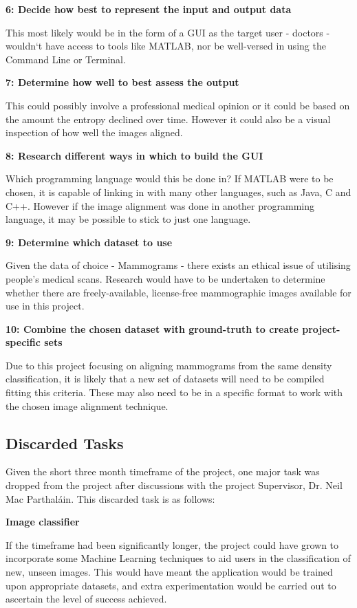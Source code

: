 \noindent \textbf{6: Decide how best to represent the input and output data}

This most likely would be in the form of a \acrshort{GUI} as the target user - doctors - wouldn`t have access to tools like MATLAB, nor be well-versed in using the Command Line or Terminal.

\noindent \textbf{7: Determine how well to best assess the output}

This could possibly involve a professional medical opinion or it could be based on the amount the entropy declined over time. However it could also be a visual inspection of how well the images aligned.

\noindent \textbf{8: Research different ways in which to build the \acrshort{GUI}}

Which programming language would this be done in? If MATLAB were to be chosen, it is capable of linking in with many other languages, such as Java, C and C++. However if the image alignment was done in another programming language, it may be possible to stick to just one language.

\noindent \textbf{9: Determine which dataset to use}

Given the data of choice - Mammograms - there exists an ethical issue of utilising people's medical scans. Research would have to be undertaken to determine whether there are freely-available, license-free mammographic images available for use in this project.

\noindent \textbf{10: Combine the chosen dataset with ground-truth to create project-specific sets}

Due to this project focusing on aligning mammograms from the same density classification, it is likely that a new set of datasets will need to be compiled fitting this criteria. These may also need to be in a specific format to work with the chosen image alignment technique.

\subsection{Discarded Tasks}

Given the short three month timeframe of the project, one major task was dropped from the project after discussions with the project Supervisor, Dr. Neil Mac Parthal\'ain. This discarded task is as follows:

\noindent \textbf{Image classifier}

If the timeframe had been significantly longer, the project could have grown to incorporate some Machine Learning techniques to aid users in the classification of new, unseen images. This would have meant the application would be trained upon appropriate datasets, and extra experimentation would be carried out to ascertain the level of success achieved.

